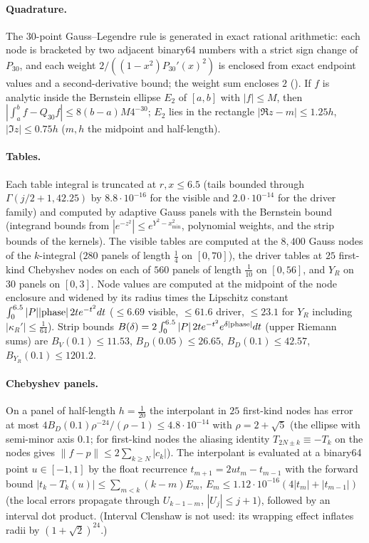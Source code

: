 \paragraph{Quadrature.} The $30$-point Gauss--Legendre rule is generated in exact rational arithmetic: each node is bracketed by two
adjacent binary64 numbers with a strict sign change of $P_{30}$, and each weight $2/((1-x^2)P_{30}'(x)^2)$ is enclosed from exact endpoint values
and a second-derivative bound; the weight sum encloses $2$ (). If $f$ is analytic inside the Bernstein ellipse $E_2$ of
$[a,b]$ with $|f|\le M$, then $|\int_a^bf-Q_{30}f|\le8(b-a)M4^{-30}$; $E_2$ lies in the rectangle $|\Re z-m|\le1.25h$, $|\Im z|\le0.75h$
($m,h$ the midpoint and half-length).

\paragraph{Tables.} Each table integral is truncated at $r,x\le6.5$ (tails bounded through $\Gamma(j/2+1,42.25)$ by
$8.8\cdot10^{-16}$ for the visible and $2.0\cdot10^{-14}$ for the driver family) and computed by adaptive Gauss panels with the Bernstein bound
(integrand bounds from $|e^{-z^2}|\le e^{Y^2-x_{\min}^2}$, polynomial weights, and the strip bounds of the kernels). The visible tables are
computed at the $8{,}400$ Gauss nodes of the $k$-integral ($280$ panels of length $\frac14$ on $[0,70]$), the driver tables at $25$
first-kind Chebyshev nodes on each of $560$ panels of length $\frac1{10}$ on $[0,56]$, and $Y_R$ on $30$ panels on $[0,3]$. Node values
are computed at the midpoint of the node enclosure and widened by its radius times the Lipschitz constant
$\int_0^{6.5}|P||{\rm phase}|\,2te^{-t^2}dt$ ($\le6.69$ visible, $\le61.6$ driver, $\le23.1$ for $Y_R$ including $|\kappa_R'|\le\frac1{64}$).
Strip bounds $B(\delta)=2\int_0^{6.5}|P|\,2te^{-t^2}e^{\delta|{\rm phase}|}dt$ (upper Riemann sums) are $B_V(0.1)\le11.53$, $B_D(0.05)\le26.65$,
$B_D(0.1)\le42.57$, $B_{Y_R}(0.1)\le1201.2$.

\paragraph{Chebyshev panels.} On a panel of half-length $h=\frac1{20}$ the interpolant in $25$ first-kind nodes has error at most
$4B_D(0.1)\rho^{-24}/(\rho-1)\le4.8\cdot10^{-14}$ with $\rho=2+\sqrt5$ (the ellipse with semi-minor axis $0.1$; for first-kind nodes the
aliasing identity $T_{2N\pm k}\equiv-T_k$ on the nodes gives $\|f-p\|\le2\sum_{k\ge N}|c_k|$). The interpolant is evaluated at a
binary64 point $u\in[-1,1]$ by the float recurrence $t_{m+1}=2ut_m-t_{m-1}$ with the forward bound
$|t_k-T_k(u)|\le\sum_{m<k}(k-m)E_m$, $E_m\le1.12\cdot10^{-16}(4|t_m|+|t_{m-1}|)$ (the local errors propagate through $U_{k-1-m}$, $|U_j|\le j+1$),
followed by an interval dot product. (Interval Clenshaw is not used: its wrapping effect inflates radii by $(1+\sqrt2)^{24}$.)


